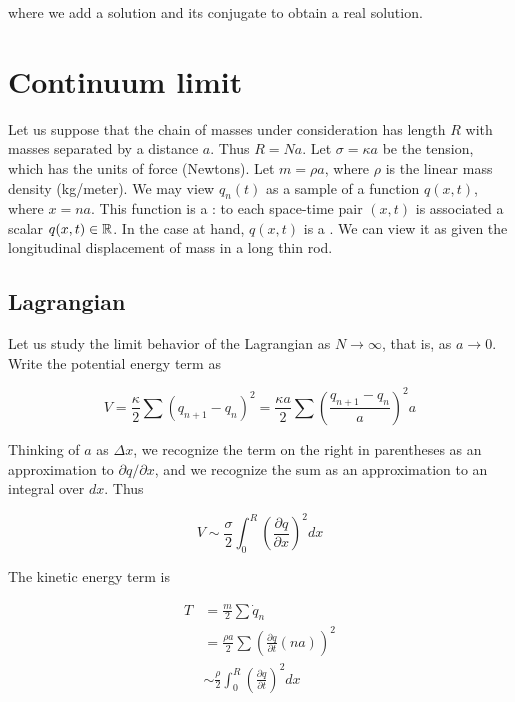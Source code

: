 where we add a solution and its conjugate to obtain a real solution.




\section{Continuum limit}

Let us suppose that the chain of masses under consideration has length $R$ with masses separated by a distance $a$.  Thus $R = Na$.  Let $\sigma = \kappa a$ be the tension, which has the units of force (Newtons).  Let $m = \rho a$, where $\rho$ is the linear mass density (kg/meter).  We may view $q_n(t)$ as a sample of a function $q(x,t)$, where $x = na$.  This function is a : to each space-time pair $(x,t)$ is associated a scalar $q(x,t) \in \Bbb{R}$. In the case at hand, $q(x,t)$ is a .  We can view it as given the longitudinal displacement of mass in a long thin rod.

\subsection{Lagrangian}

Let us study the limit behavior of the Lagrangian as $N \to \infty$, that is, as $a \to 0$. Write the potential energy term as

\begin{equation}
V = \frac{\kappa}{2} \sum ( q_{n+1} - q_n )^2
 = \frac{\kappa a}{2} \sum
\left( \frac{q_{n+1} - q_n}{a} \right)^2 a
\end{equation}

Thinking of $a$ as $\Delta x$, we recognize the term on the right in parentheses as an approximation to $\partial q/\partial x$, and we recognize the sum as an approximation to an integral over $dx$.  Thus

\begin{equation}
V \sim \frac{\sigma}{2}\int_0^R \left(\frac{\partial q}{\partial x} \right)^2 dx
\end{equation}

The kinetic energy term is

\begin{align}
T &= \frac{m}{2} \sum \dot q_n \\
&= \frac{\rho a}{2} \sum \left(  \frac{\partial q}{\partial t} (na) \right)^2 \\
&\sim \frac{\rho}{2} \int_0^R  \left(\frac{\partial q}{\partial t} \right)^2 dx
\end{align}

